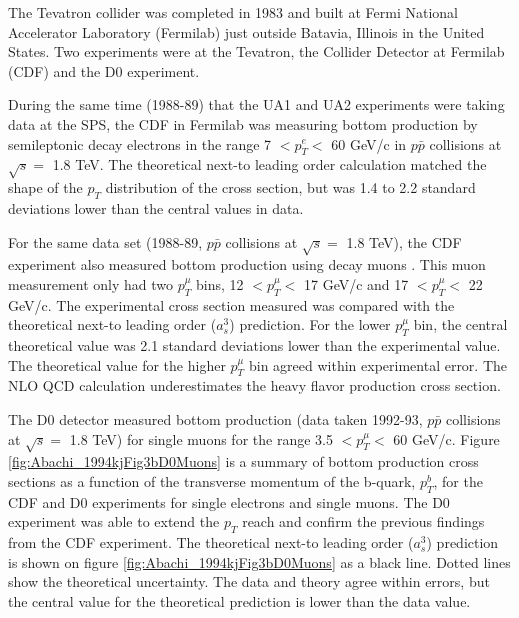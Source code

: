 


The Tevatron collider was completed in 1983 and built at Fermi National Accelerator Laboratory (Fermilab) just outside Batavia, Illinois in the United States. Two experiments were at the Tevatron, the Collider Detector at Fermilab (CDF) and the D0 experiment. 

During the same time (1988-89) that the UA1 and UA2 experiments were taking data at the SPS, the CDF in Fermilab was measuring bottom production by semileptonic decay electrons \cite{Abe:1993sj} in the range 7 $< p_{T}^{e} <$ 60 GeV/c in $p\bar p$ collisions at $\sqrt{s} = $ 1.8 TeV. The theoretical next-to leading order calculation matched the shape of the $p_{T}$ distribution of the cross section, but was 1.4 to 2.2 standard deviations lower than the central values in data. 

For the same data set (1988-89, $p\bar p$ collisions at $\sqrt{s} = $ 1.8 TeV), the CDF experiment also measured bottom production using decay muons \cite{Abe:1993hr}. This muon measurement \cite{Abe:1993hr} only had two $p_{T}^{\mu}$ bins, 12 $< p_{T}^{\mu} <$ 17 GeV/c  and 17 $< p_{T}^{\mu} <$ 22 GeV/c. The experimental cross section measured was compared with the theoretical next-to leading order ($a_{s}^{3}$) prediction. For the lower $p_{T}^{\mu}$ bin, the central theoretical value was 2.1 standard deviations lower than the experimental value. The theoretical value for the higher $p_{T}^{\mu}$ bin agreed within experimental error. The NLO QCD calculation underestimates the heavy flavor production cross section.

The D0 detector measured bottom production \cite{Abachi:1994kj} (data taken 1992-93, $p\bar p$ collisions at $\sqrt{s} = $ 1.8 TeV) for single muons for the range 3.5 $< p_{T}^{\mu} <$ 60 GeV/c. Figure \ref{fig:Abachi_1994kjFig3bD0Muons} is a summary of bottom production cross sections as a function of the transverse momentum of the b-quark, $p_{T}^{b}$, for the CDF and D0 experiments for single electrons and single muons. The D0 experiment was able to extend the $p_{T}$ reach and confirm the previous findings from the CDF experiment. The theoretical next-to leading order ($a_{s}^{3}$) prediction is shown on figure \ref{fig:Abachi_1994kjFig3bD0Muons} as a black line. Dotted lines show the theoretical uncertainty. The data and theory agree within errors, but the central value for the theoretical prediction is lower than the data value. 
 
